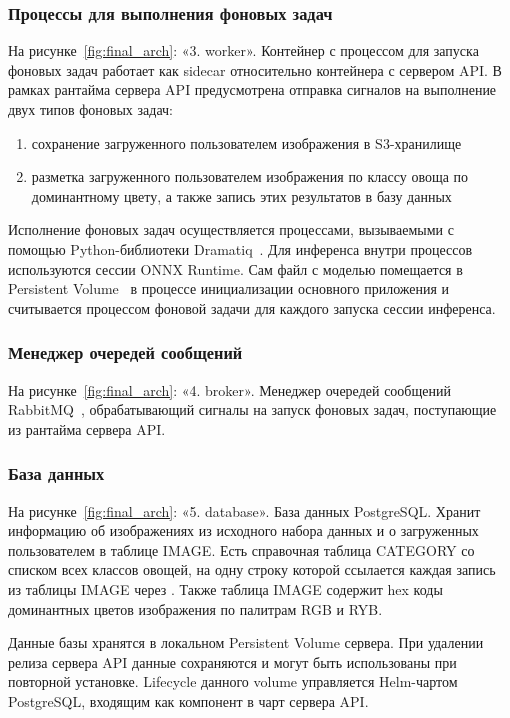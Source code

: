 \documentclass[a4paper,12pt]{extarticle}
\begin{document}
\subsubsection{Процессы для выполнения фоновых задач}

На рисунке~\ref{fig:final_arch}: «3. worker». Контейнер с процессом для запуска фоновых задач
работает как sidecar относительно контейнера с сервером API. В рамках рантайма сервера API
предусмотрена отправка сигналов на выполнение двух типов фоновых задач:

\begin{enumerate}
	\item сохранение загруженного пользователем изображения в S3-хранилище
	\item разметка загруженного пользователем изображения по классу овоща по доминантному цвету,
	а также запись этих результатов в базу данных
\end{enumerate}

Исполнение фоновых задач осуществляется процессами, вызываемыми с помощью Python-библиотеки
Dramatiq~\cite{dramatiq}. Для инференса внутри процессов используются сессии ONNX Runtime. Сам файл
с моделью помещается в Persistent Volume~\cite{pv} в процессе инициализации основного приложения
и считывается процессом фоновой задачи для каждого запуска сессии инференса.

\subsubsection{Менеджер очередей сообщений}

На рисунке~\ref{fig:final_arch}: «4. broker». Менеджер очередей сообщений RabbitMQ~\cite{rabbitmq},
обрабатывающий сигналы на запуск фоновых задач, поступающие из рантайма сервера API.

\subsubsection{База данных}

На рисунке~\ref{fig:final_arch}: «5. database». База данных PostgreSQL. Хранит информацию об
изображениях из исходного набора данных и о загруженных пользователем в таблице IMAGE. Есть
справочная таблица CATEGORY со списком всех классов овощей, на одну строку которой ссылается каждая
запись из таблицы IMAGE через . Также таблица IMAGE содержит hex коды
доминантных цветов изображения по палитрам RGB и RYB.\par

Данные базы хранятся в локальном Persistent Volume сервера. При удалении релиза сервера API данные
сохраняются и могут быть использованы при повторной установке. Lifecycle данного volume управляется
Helm-чартом PostgreSQL, входящим как компонент в чарт сервера API.

\newpage 
\printbibliography[heading=bibintoc] 
	
\end{document}

